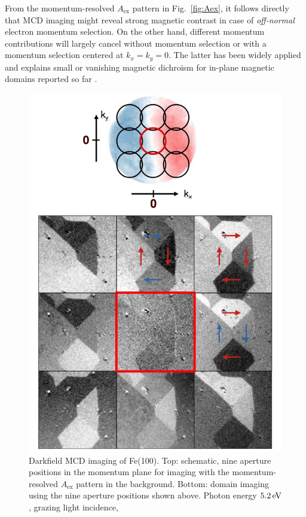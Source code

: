 \documentclass[prl,twocolumn,floatfix]{revtex4-2}
\newcommand{\rework}[1]{{\color{blue}{#1}}}
\begin{document}
From the momentum-resolved $A_{\mathrm{ex}}$ pattern in Fig.~\ref{fig:Aex}, it follows directly that MCD imaging might reveal strong magnetic contrast in case of \textit{off-normal} electron momentum selection. On the other hand, different momentum contributions will largely cancel without momentum selection or with a momentum selection centered at $k_x=k_y=0$. The latter has been widely applied and explains small or vanishing magnetic dichroism for in-plane magnetic domains reported so far \cite{marx2000}.
\begin{figure}
    \centering
    \includegraphics[width = 0.8\columnwidth]{Darkfield_overview.pdf}
    \caption{Darkfield MCD imaging of Fe(100). Top: schematic, nine aperture positions in the momentum plane for imaging with the momentum-resolved $A_{\mathrm{ex}}$ pattern in the background. Bottom: domain imaging using the nine aperture positions shown above. Photon energy $\unit[5.2]{eV}$, grazing light incidence, \rework{binding energy $\unit[xx]{eV}$.}}
    \label{fig:Imaging}
\end{figure}
\end{document}
